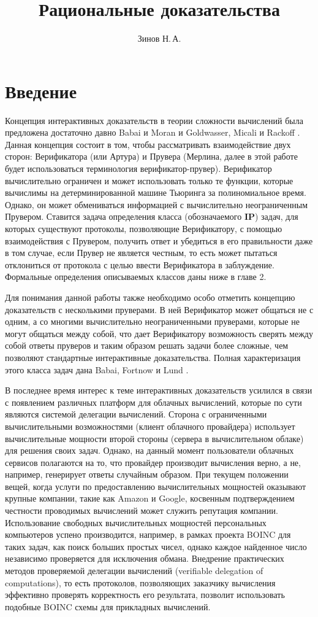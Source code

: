 \documentclass{mipt-thesis-bs}
\title{Рациональные доказательства}
\author{Зинов Н.\,А.}
\theoremstyle{plain}
\theoremstyle{definition}
\begin{document}
\frontmatter
\titlecontents
\chapter{Введение}
Концепция интерактивных доказательств в теории сложности вычислений была предложена достаточно давно Babai и Moran \cite{babai1988arthur} и Goldwasser, Micali и Rackoff \cite{goldwasser1989ip}. Данная концепция состоит в том, чтобы рассматривать взаимодействие двух сторон: Верификатора (или Артура) и Прувера (Мерлина, далее в этой работе будет использоваться терминология верификатор-прувер). Верификатор вычислительно ограничен и может использовать только те функции, которые вычислимы на детерминированной машине Тьюринга за полиномиальное время. Однако, он может обмениваться информацией с вычислительно неограниченным Прувером. Ставится задача определения класса (обозначаемого $\textbf{IP}$) задач, для которых существуют протоколы, позволяющие Верификатору, с помощью взаимодействия с Прувером, получить ответ и убедиться в его правильности даже в том случае, если Прувер не является честным, то есть может пытаться отклониться от протокола с целью ввести Верификатора в заблуждение. Формальные определения описываемых классов даны ниже в главе 2.

Для понимания данной работы также необходимо особо отметить концепцию доказательств с несколькими пруверами. В ней Верификатор может общаться не с одним, а со многими вычислительно неограниченными пруверами, которые не могут общаться между собой, что дает Верификатору возможность сверять между собой ответы пруверов и таким образом решать задачи более сложные, чем позволяют стандартные интерактивные доказательства. Полная характеризация этого класса задач дана Babai, Fortnow и Lund \cite{babai1991mip}.

В последнее время интерес к теме интерактивных доказательств усилился в связи с появлением различных платформ для облачных вычислений, которые по сути являются системой делегации вычислений. Сторона с ограниченными вычислительными возможностями (клиент облачного провайдера) использует вычислительные мощности второй стороны (сервера в вычислительном облаке) для решения своих задач. Однако, на данный момент пользователи облачных сервисов полагаются на то, что провайдер производит вычисления верно, а не, например, генерирует ответы случайным образом. При текущем положении вещей, когда услуги по предоставлению вычислительных мощностей оказывают крупные компании, такие как Amazon и Google, косвенным подтверждением честности проводимых вычислений может служить репутация компании. Использование свободных вычислительных мощностей персональных компьютеров успено производится, например, в рамках проекта BOINC \cite{anderson2004boinc} для таких задач, как поиск больших простых чисел, однако каждое найденное число независимо проверяется для исключения обмана. Внедрение практических методов проверяемой делегации вычислений (verifiable delegation of computations), то есть протоколов, позволяющих заказчику вычисления эффективно проверять корректность его результата, позволит использовать подобные BOINC схемы для прикладных вычислений.
\end{document}
